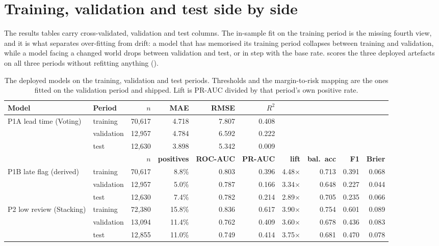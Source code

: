 \section{Training, validation and test side by side}
\label{app:tvt}

The results tables carry cross-validated, validation and test columns. The
in-sample fit on the training period is the missing fourth view, and it is
what separates over-fitting from drift: a model that has memorised its
training period collapses between training and validation, while a model
facing a changed world drops between validation and test, or in step with the
base rate.  scores the three deployed artefacts
on all three periods without refitting anything
().

\begin{table}[htbp]
\centering
\caption{The deployed models on the training, validation and test periods.
Thresholds and the margin-to-risk mapping are the ones fitted on the
validation period and shipped. Lift is PR-AUC divided by that period's own
positive rate.}
\label{tab:tvt}
\footnotesize
{\setlength{\tabcolsep}{2.3pt}
\begin{tabular}{@{}llrrrrrrrr@{}}
\toprule
\textbf{Model} & \textbf{Period} & \textbf{$n$} & \textbf{MAE} & \textbf{RMSE} & \textbf{$R^2$} & & & & \\
\midrule
P1A lead time (Voting)      & training   & 70{,}617 & 4.718 & 7.807 & 0.408 & & & & \\
                            & validation & 12{,}957 & 4.784 & 6.592 & 0.222 & & & & \\
                            & test       & 12{,}630 & 3.898 & 5.342 & 0.009 & & & & \\
\midrule
 & & \textbf{$n$} & \textbf{positives} & \textbf{ROC-AUC} & \textbf{PR-AUC} & \textbf{lift} & \textbf{bal.\ acc} & \textbf{F1} & \textbf{Brier} \\
\midrule
P1B late flag (derived)     & training   & 70{,}617 & 8.8\%  & 0.803 & 0.396 & 4.48$\times$ & 0.713 & 0.391 & 0.068 \\
                            & validation & 12{,}957 & 5.0\%  & 0.787 & 0.166 & 3.34$\times$ & 0.648 & 0.227 & 0.044 \\
                            & test       & 12{,}630 & 7.4\%  & 0.782 & 0.214 & 2.89$\times$ & 0.705 & 0.235 & 0.066 \\
\midrule
P2 low review (Stacking)    & training   & 72{,}380 & 15.8\% & 0.836 & 0.617 & 3.90$\times$ & 0.754 & 0.601 & 0.089 \\
                            & validation & 13{,}094 & 11.4\% & 0.762 & 0.409 & 3.60$\times$ & 0.678 & 0.436 & 0.083 \\
                            & test       & 12{,}855 & 11.0\% & 0.749 & 0.414 & 3.75$\times$ & 0.681 & 0.470 & 0.078 \\
\bottomrule
\end{tabular}}
\end{table}

